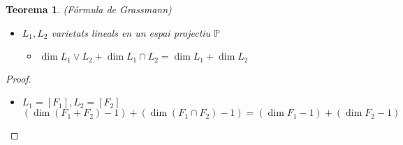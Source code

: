 \documentclass{article}
\newtheorem{theorem}{Teorema}[section]%
\theoremstyle{definition}
\newcommand{\PP}{\mathbb{P}}
\begin{document}
\begin{theorem}(Fórmula de Grassmann)
\begin{itemize}
\item $L_1, L_2$ varietats lineals en un espai projectiu $\PP$
	\begin{itemize}
	\item $\dim L_1 \vee L_2 + \dim L_1 \cap L_2 = \dim L_1 + \dim L_2$
	\end{itemize}
\end{itemize}
\end{theorem}
\begin{proof}
\begin{itemize}
\item $L_1 = [F_1], L_2 = [F_2]$
	$$(\dim (F_1 + F_2) -1) + (\dim (F_1 \cap F_2) -1) = (\dim F_1 -1) + (\dim F_2 -1)$$
\end{itemize}
\end{proof}
\end{document}
